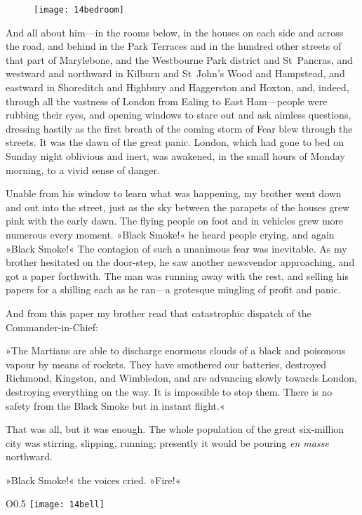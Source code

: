 \begin{figure}[tb!]
\centering
\texttt{[image: 14bedroom]}
\end{figure}

And all about him—in the rooms below, in the houses on each side and across the road, and behind in the Park Terraces and in the hundred other streets of that part of Marylebone, and the Westbourne Park district and St~Pancras, and westward and northward in Kilburn and St~John's Wood and Hampstead, and eastward in Shoreditch and Highbury and Haggerston and Hoxton, and, indeed, through all the vastness of London from Ealing to East Ham—people were rubbing their eyes, and opening windows to stare out and ask aimless questions, dressing hastily as the first breath of the coming storm of Fear blew through the streets. It was the dawn of the great panic. London, which had gone to bed on Sunday night oblivious and inert, was awakened, in the small hours of Monday morning, to a vivid sense of danger.

Unable from his window to learn what was happening, my brother went down and out into the street, just as the sky between the parapets of the houses grew pink with the early dawn. The flying people on foot and in vehicles grew more numerous every moment. »Black Smoke!« he heard people crying, and again »Black Smoke!« The contagion of such a unanimous fear was inevitable. As my brother hesitated on the door-step, he saw another newsvendor approaching, and got a paper forthwith. The man was running away with the rest, and selling his papers for a shilling each as he ran—a grotesque mingling of profit and panic.

And from this paper my brother read that catastrophic dispatch of the Commander-in-Chief:

»The Martians are able to discharge enormous clouds of a black and poisonous vapour by means of rockets. They have smothered our batteries, destroyed Richmond, Kingston, and Wimbledon, and are advancing slowly towards London, destroying everything on the way. It is impossible to stop them. There is no safety from the Black Smoke but in instant flight.«

That was all, but it was enough. The whole population of the great six-million city was stirring, slipping, running; presently it would be pouring \textit{en masse} northward.

»Black Smoke!« the voices cried. »Fire!«

\begin{wrapfigure}{O}{0.5\textwidth}
\centering
\texttt{[image: 14bell]}
\end{wrapfigure}

